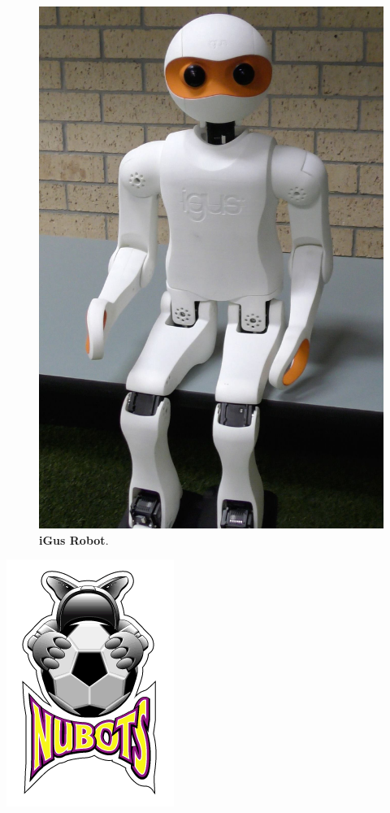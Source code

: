 \documentclass[10pt,a4paper]{article}
\begin{document}
\begin{multicols}{2}
\begin{figure}[H]
	\begin{center}
		\includegraphics[scale=0.12]{iGus}\\
		\textbf{iGus Robot}.
	\end{center}
\end{figure}

\end{multicols}

\begin{center}
	\includegraphics[scale=0.8]{nubots_logo.png}
\end{center}
\end{document}
